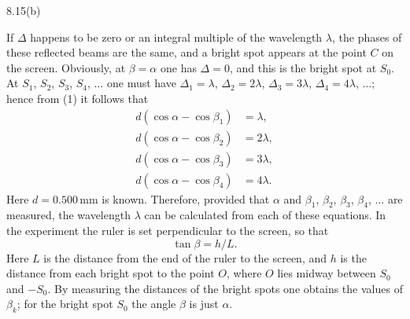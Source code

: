 \begin{figbox}{8.15(b)}
\end{figbox}

If $\Delta$ happens to be zero or an integral multiple of the wavelength $\lambda$, the phases of these reflected beams are the same, and a bright spot appears at the point $C$ on the screen. Obviously, at $\beta=\alpha$ one has $\Delta=0$, and this is the bright spot at $S_0$. At $S_1$, $S_2$, $S_3$, $S_4$, $\ldots$ one must have $\Delta_1=\lambda$, $\Delta_2=2\lambda$, $\Delta_3=3\lambda$, $\Delta_4=4\lambda$, $\ldots$; hence from (1) it follows that
\begin{align}
d(\cos\alpha-\cos\beta_1)&=\lambda, \tag{2}\\
d(\cos\alpha-\cos\beta_2)&=2\lambda, \tag{3}\\
d(\cos\alpha-\cos\beta_3)&=3\lambda, \tag{4}\\
d(\cos\alpha-\cos\beta_4)&=4\lambda. \tag{5}
\end{align}
Here $d=0.500\,\mathrm{mm}$ is known. Therefore, provided that $\alpha$ and $\beta_1$, $\beta_2$, $\beta_3$, $\beta_4$, $\ldots$ are measured, the wavelength $\lambda$ can be calculated from each of these equations. In the experiment the ruler is set perpendicular to the screen, so that
\begin{equation}
\tan\beta=h/L. \tag{6}
\end{equation}
Here $L$ is the distance from the end of the ruler to the screen, and $h$ is the distance from each bright spot to the point $O$, where $O$ lies midway between $S_0$ and $-S_0$. By measuring the distances of the bright spots one obtains the values of $\beta_k$; for the bright spot $S_0$ the angle $\beta$ is just $\alpha$.

